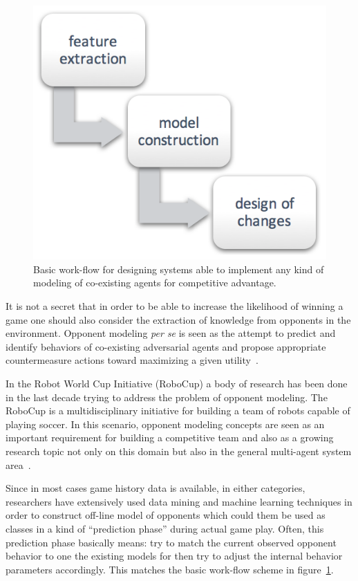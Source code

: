 \begin{figure}[htp]
  \centering  
  \includegraphics[scale=0.6]{images/02-art/oppmodelproc.png}
  \caption{Basic work-flow for designing systems able to implement any kind of modeling of co-existing agents for competitive advantage.}
   \label{behaviorModWorkFlow}
\end{figure}

It is not a secret that in order to be able to increase the likelihood of winning a game one should also consider the extraction of knowledge from opponents in the environment. Opponent modeling \textit{per se} is seen as the attempt to predict and identify behaviors of co-existing adversarial agents and propose appropriate countermeasure actions toward maximizing a given utility~\cite{fathzadeh2007opponent}.

In the Robot World Cup Initiative (RoboCup) a body of research has been done in the last decade trying to address the problem of opponent modeling. The RoboCup is a multidisciplinary initiative for building a team of robots capable of playing soccer. In this scenario, opponent modeling concepts are seen as an important requirement for building a competitive team and also as a growing research topic not only on this domain but also in the general multi-agent system area~\cite{OppRobocup}. 

Since in most cases game history data is available, in either categories, researchers have extensively used data mining and machine learning techniques in order to construct off-line model of opponents which could them be used as classes in a kind of ``prediction phase'' during actual game play. Often, this prediction phase basically means: try to match the current observed opponent behavior to one the existing models for then try to adjust the internal behavior parameters accordingly. This matches the basic work-flow scheme in figure~\ref{behaviorModWorkFlow}.

